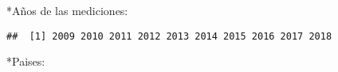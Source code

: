 \documentclass[]{article}
\newenvironment{Shaded}{\begin{snugshade}}{\end{snugshade}}
\newcommand{\KeywordTok}[1]{\textcolor[rgb]{0.13,0.29,0.53}{\textbf{#1}}}
\newcommand{\NormalTok}[1]{#1}
\newcommand{\OperatorTok}[1]{\textcolor[rgb]{0.81,0.36,0.00}{\textbf{#1}}}
\begin{document}
*Años de las mediciones:

\begin{Shaded}
\end{Shaded}

\begin{verbatim}
##  [1] 2009 2010 2011 2012 2013 2014 2015 2016 2017 2018
\end{verbatim}

*Paises:

\begin{Shaded}
\end{Shaded}
\end{document}

